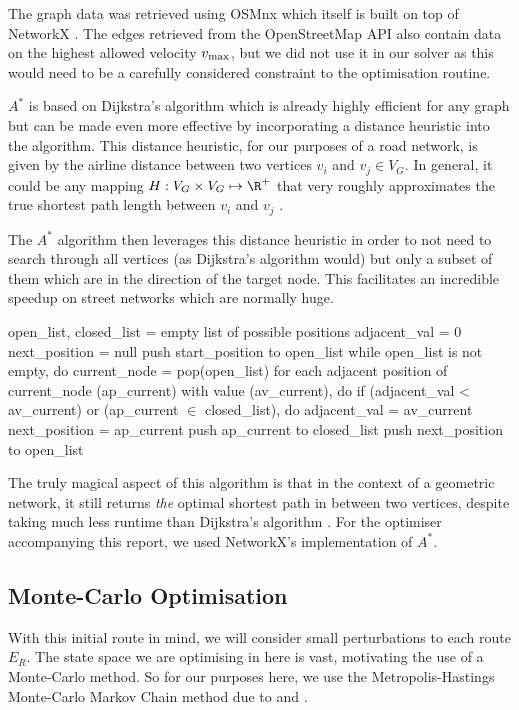 \documentclass{prettytex/ox/mmsc-special-topic}
\begin{document}
  The graph data was retrieved using OSMnx \parencite{osmnx} which itself is built on top of NetworkX \parencite{networkx}. The edges retrieved from the OpenStreetMap API also contain data on the highest allowed velocity $v_{\rm max}$, but we did not use it in our solver as this would need to be a carefully considered constraint to the optimisation routine.

  $A^*$ is based on Dijkstra's algorithm which is already highly efficient for any graph but can be made even more effective by incorporating a distance heuristic into the algorithm.
  This distance heuristic, for our purposes of a road network, is given by the airline distance between two vertices $v_i$ and $v_j \in V_G$.
  In general, it could be any mapping $H: V_G \times V_G \mapsto \R^+$ that very roughly approximates the true shortest path length between $v_i$ and $v_j$ \parencite{astar}.

  The $A^*$ algorithm then leverages this distance heuristic in order to not need to search through all vertices (as Dijkstra's algorithm would) but only a subset of them which are in the direction of the target node.
  This facilitates an incredible speedup on street networks which are normally huge.

  \begin{algorithm}[language=pseudo,basicstyle=\footnotesize,caption={\centering The $A^*$-search algorithm \parencite{astar}}]
open_list, closed_list = empty list of possible positions
adjacent_val = 0
next_position = null
push start_position to open_list
while open_list is not empty, do
  current_node = pop(open_list)
  for each adjacent position of current_node (ap_current)
        with value (av_current), do
    if (adjacent_val < av_current) or (ap_current $\in$ closed_list), do
      adjacent_val = av_current
      next_position = ap_current
    push ap_current to closed_list
  push next_position to open_list
  \end{algorithm}

  The truly magical aspect of this algorithm is that in the context of a geometric network, it still returns \textit{the} optimal shortest path in between two vertices, despite taking much less runtime than Dijkstra's algorithm \parencite{astar}.
  For the optimiser accompanying this report, we used NetworkX's implementation of $A^*$.

  \subsection{Monte-Carlo Optimisation}
  With this initial route in mind, we will consider small perturbations to each route $E_R$.
  The state space we are optimising in here is vast, motivating the use of a Monte-Carlo method.
  So for our purposes here, we use the Metropolis-Hastings Monte-Carlo Markov Chain method due to \cite{metropolis} and \cite{hastings}.
\end{document}
